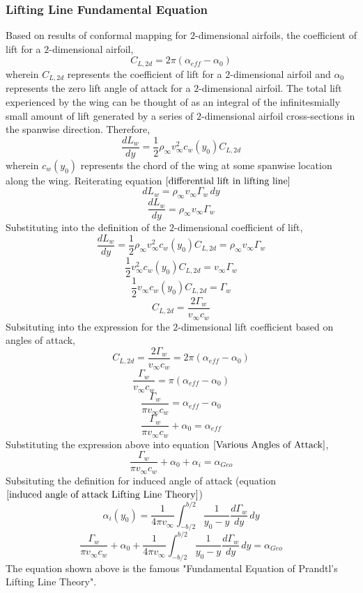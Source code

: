 \documentclass[a4paper, 12pt]{report}
\begin{document}
\begin{center}
\subsubsection{Lifting Line Fundamental Equation}
\begin{comment}
\end{comment}
Based on results of conformal mapping for $2$-dimensional airfoils, the coefficient of lift for a $2$-dimensional airfoil,
$$C_{L,2d} = 2\pi(\alpha_{eff}-\alpha_{0})$$
wherein $C_{L,2d}$ represents the coefficient of lift for a $2$-dimensional airfoil and $\alpha_{0}$ represents the zero lift angle of attack for a $2$-dimensional airfoil. The total lift experienced by the wing can be thought of as an integral of the infinitesmially small amount of lift generated by a series of $2$-dimensional airfoil cross-sections in the spanwise direction. Therefore,
$$\frac{dL_{w}}{dy} = \frac{1}{2}\rho_{\infty}v_{\infty}^{2}c_{w}(y_{0}) C_{L,2d}$$
wherein $c_{w}(y_{0})$ represents the chord of the wing at some spanwise location along the wing.
Reiterating equation $\ref{differential lift in lifting line}$
$$dL_{w} = \rho_{\infty}v_{\infty}\Gamma_{w}\,dy$$
$$\frac{dL_{w}}{dy} = \rho_{\infty}v_{\infty}\Gamma_{w}$$
Substituting into the definition of the $2$-dimensional coefficient of lift,
$$\frac{dL_{w}}{dy} = \frac{1}{2}\rho_{\infty}v_{\infty}^{2}c_{w}(y_{0}) C_{L,2d} = \rho_{\infty}v_{\infty}\Gamma_{w}$$
$$\frac{1}{2}v_{\infty}^{2}c_{w}(y_{0}) C_{L,2d} = v_{\infty}\Gamma_{w}$$
$$\frac{1}{2}v_{\infty}c_{w}(y_{0}) C_{L,2d} = \Gamma_{w}$$
$$C_{L,2d} = \frac{2\Gamma_{w}}{v_{\infty}c_{w}}$$
Subsituting into the expression for the $2$-dimensional lift coefficient based on angles of attack,
$$C_{L,2d} = \frac{2\Gamma_{w}}{v_{\infty}c_{w}} = 2\pi(\alpha_{eff}-\alpha_{0})$$
$$\frac{\Gamma_{w}}{v_{\infty}c_{w}} = \pi(\alpha_{eff}-\alpha_{0})$$
$$\frac{\Gamma_{w}}{\pi v_{\infty}c_{w}} = \alpha_{eff}-\alpha_{0}$$
$$\frac{\Gamma_{w}}{\pi v_{\infty}c_{w}} + \alpha_{0} = \alpha_{eff}$$
Substituting the expression above into equation $\ref{Various Angles of Attack}$,
$$\frac{\Gamma_{w}}{\pi v_{\infty}c_{w}} + \alpha_{0} + \alpha_{i} = \alpha_{Geo}$$
Subsituting the definition for induced angle of attack (equation $\ref{induced angle of attack Lifting Line Theory}$)
$$\alpha_{i}(y_{0}) = \frac{1}{4\pi v_{\infty}} \int^{b/2}_{-b/2}\frac{1}{y_{0}-y}\frac{d\Gamma_{w}}{dy} \,dy$$
\begin{equation}
\frac{\Gamma_{w}}{\pi v_{\infty}c_{w}} + \alpha_{0} + \frac{1}{4\pi v_{\infty}} \int^{b/2}_{-b/2}\frac{1}{y_{0}-y}\frac{d\Gamma_{w}}{dy} \,dy = \alpha_{Geo}
\label{Fundamental Equation of Lifting Line Theory}
\end{equation}
The equation shown above is the famous "Fundamental Equation of Prandtl's Lifting Line Theory".


\end{center}
\end{document}
